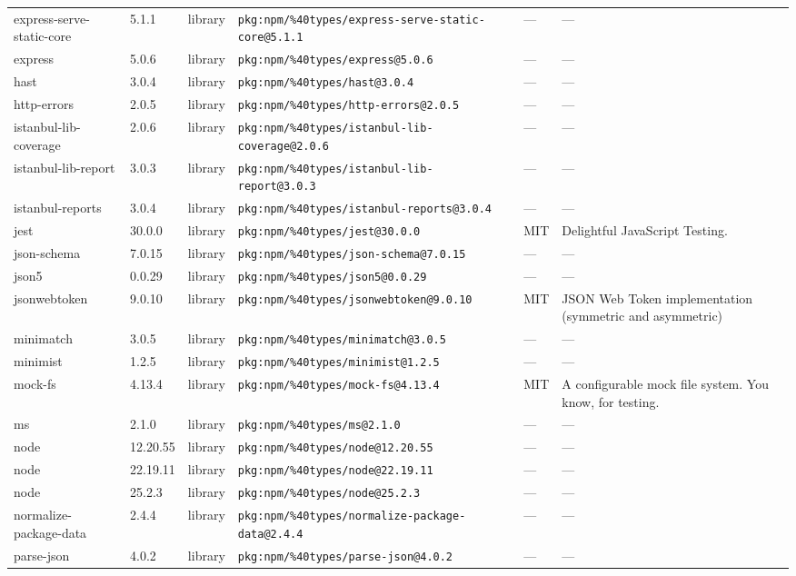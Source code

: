 \documentclass[11pt]{article}
\begin{document}
\begin{longtable}{|l|l|l|p{2.2cm}|l|p{4cm}|}
express-serve-static-core & 5.1.1 & library & \texttt{pkg:npm/\%40types/express-serve-static-core@5.1.1} & — & — \\
express & 5.0.6 & library & \texttt{pkg:npm/\%40types/express@5.0.6} & — & — \\
hast & 3.0.4 & library & \texttt{pkg:npm/\%40types/hast@3.0.4} & — & — \\
http-errors & 2.0.5 & library & \texttt{pkg:npm/\%40types/http-errors@2.0.5} & — & — \\
istanbul-lib-coverage & 2.0.6 & library & \texttt{pkg:npm/\%40types/istanbul-lib-coverage@2.0.6} & — & — \\
istanbul-lib-report & 3.0.3 & library & \texttt{pkg:npm/\%40types/istanbul-lib-report@3.0.3} & — & — \\
istanbul-reports & 3.0.4 & library & \texttt{pkg:npm/\%40types/istanbul-reports@3.0.4} & — & — \\
jest & 30.0.0 & library & \texttt{pkg:npm/\%40types/jest@30.0.0} & MIT & Delightful JavaScript Testing. \\
json-schema & 7.0.15 & library & \texttt{pkg:npm/\%40types/json-schema@7.0.15} & — & — \\
json5 & 0.0.29 & library & \texttt{pkg:npm/\%40types/json5@0.0.29} & — & — \\
jsonwebtoken & 9.0.10 & library & \texttt{pkg:npm/\%40types/jsonwebtoken@9.0.10} & MIT & JSON Web Token implementation (symmetric and asymmetric) \\
minimatch & 3.0.5 & library & \texttt{pkg:npm/\%40types/minimatch@3.0.5} & — & — \\
minimist & 1.2.5 & library & \texttt{pkg:npm/\%40types/minimist@1.2.5} & — & — \\
mock-fs & 4.13.4 & library & \texttt{pkg:npm/\%40types/mock-fs@4.13.4} & MIT & A configurable mock file system.  You know, for testing. \\
ms & 2.1.0 & library & \texttt{pkg:npm/\%40types/ms@2.1.0} & — & — \\
node & 12.20.55 & library & \texttt{pkg:npm/\%40types/node@12.20.55} & — & — \\
node & 22.19.11 & library & \texttt{pkg:npm/\%40types/node@22.19.11} & — & — \\
node & 25.2.3 & library & \texttt{pkg:npm/\%40types/node@25.2.3} & — & — \\
normalize-package-data & 2.4.4 & library & \texttt{pkg:npm/\%40types/normalize-package-data@2.4.4} & — & — \\
parse-json & 4.0.2 & library & \texttt{pkg:npm/\%40types/parse-json@4.0.2} & — & — \\

\end{longtable}
\end{document}
